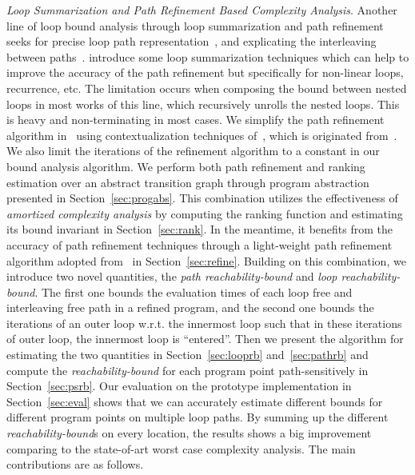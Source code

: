 \emph{Loop Summarization and Path Refinement Based Complexity Analysis}.
Another line of loop bound analysis through loop summarization and path refinement seeks for precise loop path representation~\cite{ManoliosV06,BalakrishnanSIG09,SharmaDDA11,Flores-MontoyaH14,HumenbergerJK18,CyphertBKR19}, and explicating the interleaving between paths~\cite{GulwaniJK09,ZulegerGSV11}.
\cite{KincaidBCR19,KincaidCBR18,BreckCKR20} introduce some loop summarization techniques which can help to improve the accuracy of the path refinement but specifically for non-linear loops, recurrence, etc.
The limitation occurs when composing the bound between nested loops in most works of this line, which recursively unrolls the nested loops. This is heavy and non-terminating in most cases.
%
We simplify the path refinement algorithm in~\cite{GulwaniJK09} using contextualization techniques of~\cite{ZulegerGSV11,SinnZV14}, which is originated from~\cite{ManoliosV06}.
We also limit the iterations of the refinement algorithm to a constant in our bound analysis algorithm.
%
We perform both path refinement and ranking estimation over an abstract transition graph through program abstraction presented in Section~\ref{sec:progabs}.
This combination utilizes the effectiveness of \emph{amortized complexity analysis} by computing the ranking function
and estimating its bound invariant in Section~\ref{sec:rank}.
In the meantime, it benefits from the accuracy of path refinement techniques through a light-weight path refinement algorithm adopted from~\cite{GulwaniJK09} in Section~\ref{sec:refine}.
Building on this combination, we introduce two novel quantities,
the \emph{path reachability-bound} and \emph{loop reachability-bound}.
The first one bounds the evaluation times of each loop free and interleaving free path in a refined program, and the second one bounds the iterations of an outer loop w.r.t. the innermost loop such that in these iterations of outer loop, the innermost loop is ``entered''. 
Then we present the algorithm for estimating the two quantities in Section~\ref{sec:looprb} and~\ref{sec:pathrb} and compute the \emph{reachability-bound} for each program point path-sensitively in Section~\ref{sec:psrb}.
Our evaluation on the prototype implementation in Section~\ref{sec:eval} shows that we can accurately estimate different bounds for different program points on multiple loop paths. By summing up the different \emph{reachability-bound}s on every location, the results shows a big improvement comparing to the state-of-art worst case complexity analysis.
The main contributions are as follows.

